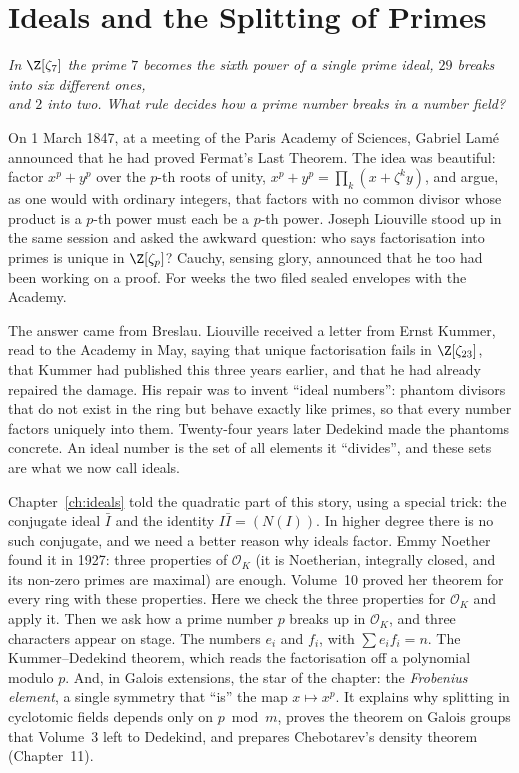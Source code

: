 \chapter{Ideals and the Splitting of Primes}
\begin{center}\itshape
In $\Z[\zeta_7]$ the prime $7$ becomes the sixth power of a single prime ideal, $29$ breaks into six different ones,\\
and $2$ into two. What rule decides how a prime number breaks in a number field?
\end{center}

On 1 March 1847, at a meeting of the Paris Academy of Sciences, Gabriel Lamé announced that he had proved Fermat's Last
Theorem. The idea was beautiful: factor $x^p+y^p$ over the $p$-th roots of unity, $x^p+y^p=\prod_k(x+\zeta^ky)$, and argue,
as one would with ordinary integers, that factors with no common divisor whose product is a $p$-th power must each be a
$p$-th power. Joseph Liouville stood up in the same session and asked the awkward question: who says factorisation into
primes is unique in $\Z[\zeta_p]$? Cauchy, sensing glory, announced that he too had been working on a proof. For weeks the
two filed sealed envelopes with the Academy.

The answer came from Breslau. Liouville received a letter from Ernst Kummer, read to the Academy in May, saying that
unique factorisation fails in $\Z[\zeta_{23}]$, that Kummer had published this three years earlier, and that he had
already repaired the damage. His repair was to invent ``ideal numbers'': phantom divisors that do not exist in the ring
but behave exactly like primes, so that every number factors uniquely into them. Twenty-four years later Dedekind made the
phantoms concrete. An ideal number is the set of all elements it ``divides'', and these sets are what we now call
ideals.

Chapter~\ref{ch:ideals} told the quadratic part of this story, using a special trick: the conjugate ideal $\bar I$ and the
identity $I\bar I=(N(I))$. In higher degree there is no such conjugate, and we need a better reason why ideals factor.
Emmy Noether found it in 1927: three properties of $\mathcal O_K$ (it is Noetherian, integrally closed, and its non-zero
primes are maximal) are enough. Volume~10 proved her theorem for every ring with these properties. Here we check the
three properties for $\mathcal O_K$ and apply it. Then we ask how a prime number $p$ breaks up in $\mathcal O_K$, and three characters
appear on stage. The numbers $e_i$ and $f_i$, with $\sum e_if_i=n$. The Kummer--Dedekind theorem, which reads the
factorisation off a polynomial modulo $p$. And, in Galois extensions, the star of the chapter: the \emph{Frobenius
element}, a single symmetry that ``is'' the map $x\mapsto x^p$. It explains why splitting in cyclotomic fields depends only
on $p\bmod m$, proves the theorem on Galois groups that Volume~3 left to Dedekind, and prepares Chebotarev's density theorem
(Chapter~11).

